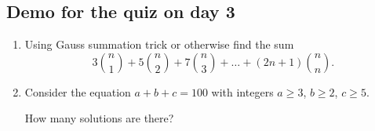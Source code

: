 \documentclass[12pt]{article}
\begin{document}
\subsection*{Demo for the quiz on day 3}

\begin{enumerate}
    \item Using Gauss summation trick or otherwise find the sum 
    \[
    3 {n \choose 1} + 5 {n \choose 2} + 7 {n \choose 3} + \dots + (2n + 1) {n \choose n}.
    \]
    \item Consider the equation $a + b + c = 100$ with integers $a \geq 3$, $b \geq 2$, $c\geq 5$.
    
    How many solutions are there?
\end{enumerate}
\end{document}
